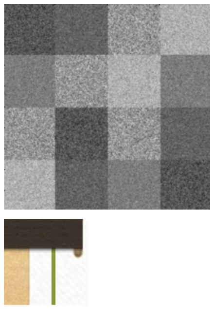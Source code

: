 \documentclass[11pt]{article}
\begin{document}
\begin{figure}[!htb]
\begin{center}
\begin{multicols}{3}
    \includegraphics[height = \linewidth]{squares}\par
	\includegraphics[height = \linewidth]{test}\

\end{multicols}
\end{center}
\end{figure}
\end{document}
